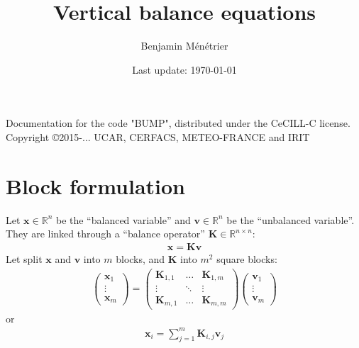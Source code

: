 \documentclass[12pt]{article}
\begin{document}
\title{Vertical balance equations}
\author{Benjamin Ménétrier}
\date{Last update: \today}

\thispagestyle{empty}

\maketitle
\begin{center}
Documentation for the code "BUMP", distributed under the CeCILL-C license.\\
Copyright \copyright 2015-... UCAR, CERFACS, METEO-FRANCE and IRIT
\end{center}

\tableofcontents

\clearpage
\section{Block formulation}
Let $\mathbf{x} \in \mathbb{R}^n$ be the ``balanced variable'' and $\mathbf{v} \in \mathbb{R}^n$ be the ``unbalanced variable''. They are linked through a ``balance operator'' $\mathbf{K} \in \mathbb{R}^{n \times n}$:
\begin{align}
\mathbf{x} = \mathbf{K} \mathbf{v}
\end{align}
Let split $\mathbf{x}$ and $\mathbf{v}$ into $m$ blocks, and $\mathbf{K}$ into $m^2$ square blocks:
\begin{align}
\left(\begin{array}{c}
\mathbf{x}_1 \\
\vdots \\
\mathbf{x}_m
\end{array} \right) = \left(\begin{array}{ccc}
\mathbf{K}_{1,1} & \dots & \mathbf{K}_{1,m} \\
\vdots & \ddots & \vdots \\
\mathbf{K}_{m,1} & \dots & \mathbf{K}_{m,m} 
\end{array} \right) \left(\begin{array}{c}
\mathbf{v}_1 \\
\vdots \\
\mathbf{v}_m
\end{array} \right)
\end{align}
or
\begin{align}
\label{eq:full}
\mathbf{x}_i = \sum_{j=1}^m \mathbf{K}_{i,j} \mathbf{v}_j
\end{align}
\end{document}
